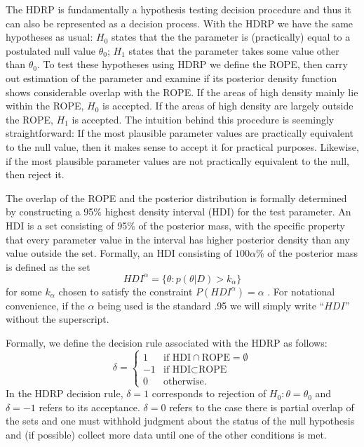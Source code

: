 \documentclass[man]{apa}
\newcommand{\hdr}{HDRP}
\begin{document}
The \hdr{} is fundamentally a hypothesis testing decision procedure and thus it can also be represented as a decision process. With the \hdr{} we have the same hypotheses as usual: $H_0$ states that the the parameter is (practically) equal to a postulated null value $\theta_0$; $H_1$ states that the parameter takes some value other than $\theta_0$. To test these hypotheses using \hdr{} we define the ROPE, then carry out estimation of the parameter and examine if its posterior density function shows considerable overlap with the ROPE. If the areas of high density mainly lie within the ROPE, $H_0$ is accepted. If the areas of high density are largely outside the ROPE, $H_1$ is accepted. The intuition behind this procedure is seemingly straightforward: If the most plausible parameter values are practically equivalent to the null value, then it makes sense to accept it for practical purposes. Likewise, if the most plausible parameter values are not practically equivalent to the null, then reject it.

The overlap of the ROPE and the posterior distribution is formally determined by constructing a 95\% highest density interval (HDI) for the test parameter. An HDI is a set consisting of 95\% of the posterior mass, with the specific property that every parameter value in the interval has higher posterior density than any value outside the set. Formally, an HDI consisting of $100\alpha\%$ of the posterior mass is defined as the set  
\begin{equation}
    HDI^\alpha = \{\theta:p(\theta|D)>k_\alpha\}\label{eq:hdi}
\end{equation}
for some $k_\alpha$ chosen to satisfy the constraint $P(HDI^\alpha)=\alpha$ \cite{druilhet2007}. For notational convenience, if the $\alpha$ being used is the standard .95 we will simply write ``$HDI$'' without the superscript. 

Formally, we define the decision rule associated with the \hdr{} as follows:
\begin{equation*}
    \delta =
    \begin{cases}
    1 & \text{if HDI} \cap \text{ROPE} = \emptyset \\ %
    -1 & \text{if HDI} \subset \text{ROPE}\\
    0 & \text{otherwise}.
    \end{cases}
\end{equation*}
In the \hdr{} decision rule, $\delta=1$ corresponds to rejection of $H_0:\theta=\theta_0$ and $\delta=-1$ refers to its acceptance. $\delta=0$ refers to the case there is partial overlap of the sets and one must withhold judgment about the status of the null hypothesis and (if possible) collect more data until one of the other conditions is met.
\end{document}
